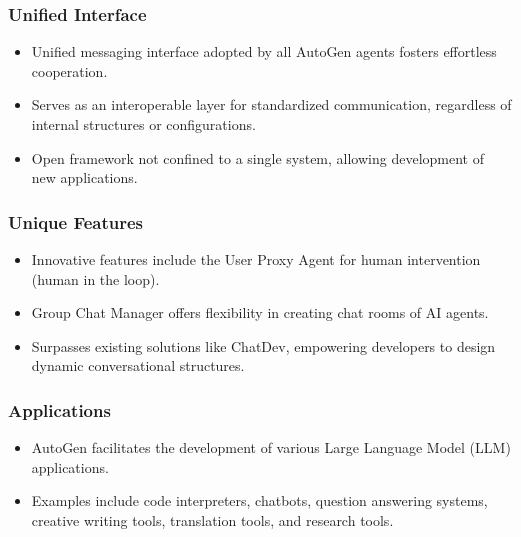 \begin{frame}[fragile]\frametitle{Unified Interface}
  \begin{itemize}
    \item Unified messaging interface adopted by all AutoGen agents fosters effortless cooperation.
    \item Serves as an interoperable layer for standardized communication, regardless of internal structures or configurations.
    \item Open framework not confined to a single system, allowing development of new applications.
  \end{itemize}
\end{frame}

\begin{frame}[fragile]\frametitle{Unique Features}
  \begin{itemize}
    \item Innovative features include the User Proxy Agent for human intervention (human in the loop).
    \item Group Chat Manager offers flexibility in creating chat rooms of AI agents.
    \item Surpasses existing solutions like ChatDev, empowering developers to design dynamic conversational structures.
  \end{itemize}
\end{frame}

\begin{frame}[fragile]\frametitle{Applications}
  \begin{itemize}
    \item AutoGen facilitates the development of various Large Language Model (LLM) applications.
    \item Examples include code interpreters, chatbots, question answering systems, creative writing tools, translation tools, and research tools.
  \end{itemize}
\end{frame}

